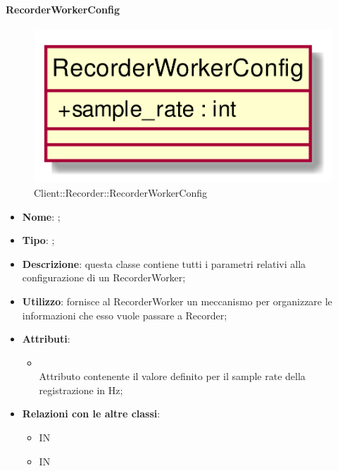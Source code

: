 \hypertarget{RecorderWorkerConfig_label}{\paragraph{RecorderWorkerConfig}}
\begin{figure}[h]
	\centering
	\includegraphics[width=\textwidth,height=\textheight,keepaspectratio]{images/ClassRecorderWorkerConfig.png}
	\caption{Client::Recorder::RecorderWorkerConfig}
\end{figure}
\begin{itemize}
	\item \textbf{Nome}: ;
	\item \textbf{Tipo}: ;
	\item \textbf{Descrizione}: questa classe contiene tutti i parametri relativi alla configurazione di un RecorderWorker;
	\item \textbf{Utilizzo}: fornisce al RecorderWorker un meccanismo per organizzare le informazioni che esso vuole passare a Recorder;
	\item \textbf{Attributi}:
	\begin{itemize}
		\item[]  \\
		Attributo contenente il valore definito per il sample rate della registrazione in Hz;
	\end{itemize}
	\item \textbf{Relazioni con le altre classi}:
	\begin{itemize}
		\item IN \hyperlink{RecorderWorker_label}{}
		\item IN \hyperlink{RecorderWorkerMsg_label}{}
	\end{itemize}
\end{itemize}
\FloatBarrier

